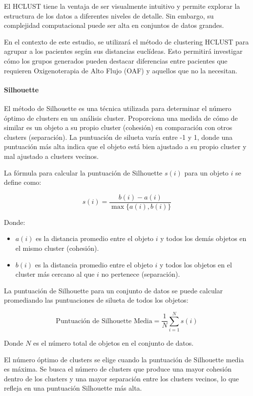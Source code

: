 El HCLUST tiene la ventaja de ser visualmente intuitivo y permite explorar la estructura de los datos a diferentes niveles de detalle. Sin embargo, su complejidad computacional puede ser alta en conjuntos de datos grandes.

En el contexto de este estudio, se utilizará el método de clustering HCLUST para agrupar a los pacientes según sus distancias euclídeas. Esto permitirá investigar cómo los grupos generados pueden destacar diferencias entre pacientes que requieren Oxigenoterapia de Alto Flujo (OAF) y aquellos que no la necesitan.

\paragraph{Silhouette}\label{sec:silhouette}
El método de Silhouette es una técnica utilizada para determinar el número óptimo de clusters en un análisis cluster. Proporciona una medida de cómo de similar es un objeto a su propio cluster (cohesión) en comparación con otros clusters (separación). La puntuación de silueta varía entre -1 y 1, donde una puntuación más alta indica que el objeto está bien ajustado a su propio cluster y mal ajustado a clusters vecinos.

La fórmula para calcular la puntuación de Silhouette \(s(i)\) para un objeto \(i\) se define como:

\[ s(i) = \frac{b(i) - a(i)}{\max\{a(i), b(i)\}} \]

Donde:
\begin{itemize}
    \item \(a(i)\) es la distancia promedio entre el objeto \(i\) y todos los demás objetos en el mismo cluster (cohesión).
    \item \(b(i)\) es la distancia promedio entre el objeto \(i\) y todos los objetos en el cluster más cercano al que \(i\) no pertenece (separación).
\end{itemize}

La puntuación de Silhouette para un conjunto de datos se puede calcular promediando las puntuaciones de silueta de todos los objetos:

\[ \text{Puntuación de Silhouette Media} = \frac{1}{N} \sum_{i=1}^{N} s(i) \]

Donde \(N\) es el número total de objetos en el conjunto de datos.

El número óptimo de clusters se elige cuando la puntuación de Silhouette media es máxima. Se busca el número de clusters que produce una mayor cohesión dentro de los clusters y una mayor
separación entre los clusters vecinos, lo que refleja en una puntuación Silhouette más alta.



